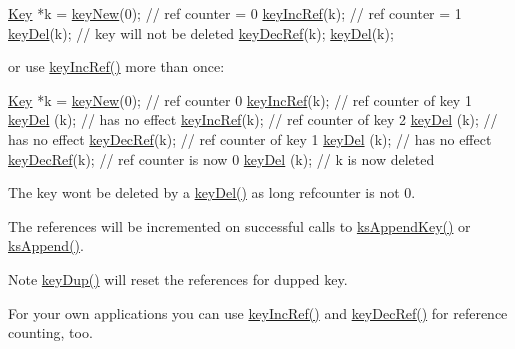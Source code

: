 \begin{DoxyCodeInclude}
\hyperlink{classkdb_1_1Key_a5679f5cae63caddd64a60388b9cc77fa}{Key} *k = \hyperlink{group__key_gad23c65b44bf48d773759e1f9a4d43b89}{keyNew}(0); \textcolor{comment}{// ref counter = 0}
\hyperlink{group__key_ga6970a6f254d67af7e39f8e469bb162f1}{keyIncRef}(k); \textcolor{comment}{// ref counter = 1}
\hyperlink{group__key_ga3df95bbc2494e3e6703ece5639be5bb1}{keyDel}(k); \textcolor{comment}{// key will not be deleted}
\hyperlink{group__key_ga2c6433ca22109e4e141946057eccb283}{keyDecRef}(k);
\hyperlink{group__key_ga3df95bbc2494e3e6703ece5639be5bb1}{keyDel}(k);
\end{DoxyCodeInclude}
 or use \hyperlink{group__key_ga6970a6f254d67af7e39f8e469bb162f1}{key\+Inc\+Ref()} more than once\+:


\begin{DoxyCodeInclude}
\hyperlink{classkdb_1_1Key_a5679f5cae63caddd64a60388b9cc77fa}{Key} *k = \hyperlink{group__key_gad23c65b44bf48d773759e1f9a4d43b89}{keyNew}(0); \textcolor{comment}{// ref counter 0}
\hyperlink{group__key_ga6970a6f254d67af7e39f8e469bb162f1}{keyIncRef}(k); \textcolor{comment}{// ref counter of key 1}
\hyperlink{group__key_ga3df95bbc2494e3e6703ece5639be5bb1}{keyDel} (k);   \textcolor{comment}{// has no effect}
\hyperlink{group__key_ga6970a6f254d67af7e39f8e469bb162f1}{keyIncRef}(k); \textcolor{comment}{// ref counter of key 2}
\hyperlink{group__key_ga3df95bbc2494e3e6703ece5639be5bb1}{keyDel} (k);   \textcolor{comment}{// has no effect}
\hyperlink{group__key_ga2c6433ca22109e4e141946057eccb283}{keyDecRef}(k); \textcolor{comment}{// ref counter of key 1}
\hyperlink{group__key_ga3df95bbc2494e3e6703ece5639be5bb1}{keyDel} (k);   \textcolor{comment}{// has no effect}
\hyperlink{group__key_ga2c6433ca22109e4e141946057eccb283}{keyDecRef}(k); \textcolor{comment}{// ref counter is now 0}
\hyperlink{group__key_ga3df95bbc2494e3e6703ece5639be5bb1}{keyDel} (k); \textcolor{comment}{// k is now deleted}
\end{DoxyCodeInclude}
 The key won\textquotesingle{}t be deleted by a \hyperlink{group__key_ga3df95bbc2494e3e6703ece5639be5bb1}{key\+Del()} as long refcounter is not 0.

The references will be incremented on successful calls to \hyperlink{group__keyset_gaa5a1d467a4d71041edce68ea7748ce45}{ks\+Append\+Key()} or \hyperlink{group__keyset_ga21eb9c3a14a604ee3a8bdc779232e7b7}{ks\+Append()}.

\begin{DoxyNote}{Note}
\hyperlink{group__key_gae6ec6a60cc4b8c1463fa08623d056ce3}{key\+Dup()} will reset the references for dupped key.
\end{DoxyNote}
For your own applications you can use \hyperlink{group__key_ga6970a6f254d67af7e39f8e469bb162f1}{key\+Inc\+Ref()} and \hyperlink{group__key_ga2c6433ca22109e4e141946057eccb283}{key\+Dec\+Ref()} for reference counting, too.


